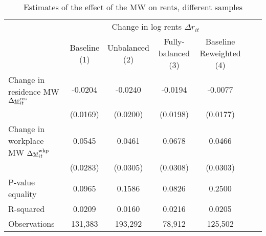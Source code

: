 \begin{table}[hbt!]
    \caption{Estimates of the effect of the MW on rents, different samples}
    \label{tab:static_sample}

    \begin{tabular}{@{}lcccccc@{}}
        \toprule
                                             & \multicolumn{4}{c}{Change in log rents $\Delta r_{it}$}                   \\ \cmidrule(l){2-5} 
                                             & \shortstack{Baseline\\(1)}       & \shortstack{Unbalanced\\(2)}     
                                             & \shortstack{Fully-balanced\\(3)} & \shortstack{Baseline\\Reweighted (4)}  \\ \midrule
        Change in residence MW 
                  $\Delta\underline{w}_{it}^{\text{res}}$    & -0.0204      & -0.0240        & -0.0194       & -0.0077               \\
                                             & (0.0169)    & (0.0200)      & (0.0198)     & (0.0177)              \\
        Change in workplace MW 
                   $\Delta\underline{w}_{it}^{\text{wkp}}$   & 0.0545      & 0.0461        & 0.0678       & 0.0466               \\
                                             & (0.0283)    & (0.0305)      & (0.0308)     & (0.0303)              \\ \midrule
        P-value equality                     & 0.0965      & 0.1586        & 0.0826       & 0.2500               \\
        R-squared                            & 0.0209      & 0.0160        & 0.0216       & 0.0205               \\
        Observations                         & 131,383     & 193,292       & 78,912      & 125,502             \\ \bottomrule
    \end{tabular}


\end{table}
